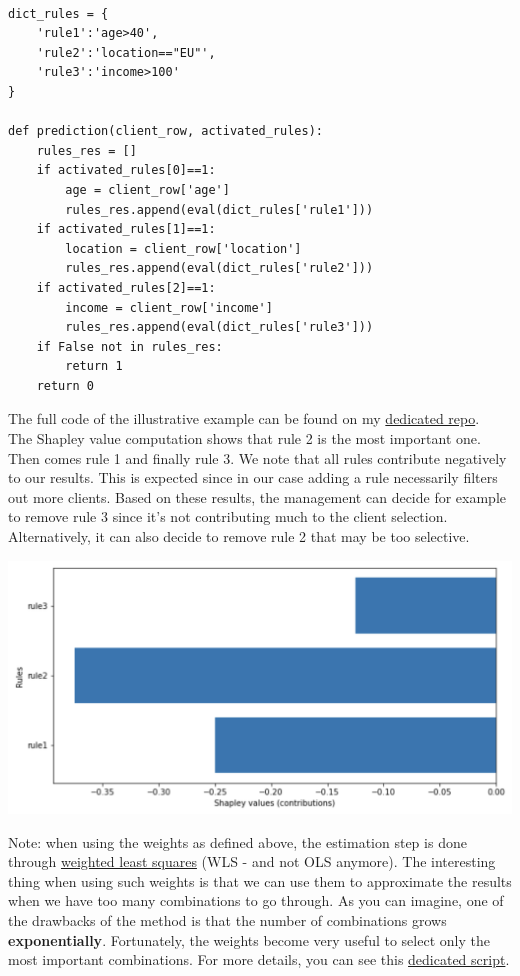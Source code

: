\lstset{language=Python}
\lstset{frame=lines}
\lstset{basicstyle=\footnotesize}
\begin{lstlisting}

dict_rules = {
    'rule1':'age>40',
    'rule2':'location=="EU"',
    'rule3':'income>100'
}

def prediction(client_row, activated_rules):
    rules_res = []
    if activated_rules[0]==1:
        age = client_row['age']
        rules_res.append(eval(dict_rules['rule1']))
    if activated_rules[1]==1:
        location = client_row['location']
        rules_res.append(eval(dict_rules['rule2']))
    if activated_rules[2]==1:
        income = client_row['income']
        rules_res.append(eval(dict_rules['rule3']))
    if False not in rules_res:
        return 1
    return 0

\end{lstlisting}

The full code of the illustrative example can be found on my \href{https://github.com/savoga/shap-explain}{dedicated repo}. \\

The Shapley value computation shows that rule 2 is the most important one. Then comes rule 1 and finally rule 3. We note that all rules contribute negatively to our results. This is expected since in our case adding a rule necessarily filters out more clients. Based on these results, the management can decide for example to remove rule 3 since it's not contributing much to the client selection. Alternatively, it can also decide to remove rule 2 that may be too selective.

\begin{center}
\includegraphics[scale=0.6]{./../img/shapley-results.png}
\end{center}

Note: when using the weights as defined above, the estimation step is done through \href{https://en.wikipedia.org/wiki/Weighted_least_squares}{weighted least squares} (WLS - and not OLS anymore). The interesting thing when using such weights is that we can use them to approximate the results when we have too many combinations to go through. As you can imagine, one of the drawbacks of the method is that the number of combinations grows \textbf{exponentially}. Fortunately, the weights become very useful to select only the most important combinations. For more details, you can see this \href{https://github.com/savoga/shap-explain/blob/main/code/shap-rules-approximations.py}{dedicated script}. \\

